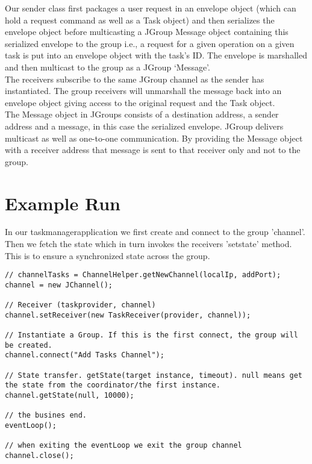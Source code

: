 Our sender class first packages a user request in an envelope object (which can hold a request command as well as a Task object) and then serializes the envelope object before multicasting a JGroup Message object containing this serialized envelope to the group i.e., 
a request for a given operation on a given task is put into an envelope object with the task’s ID. The envelope is marshalled and then multicast to the group as a JGroup ‘Message’.\\

The receivers subscribe to the same JGroup channel as the sender has instantiated. The group receivers will unmarshall the message back into an envelope object giving access to the original request and the Task object. \\

The Message object in JGroups consists of a destination address, a sender address and a message, in this case the serialized envelope. JGroup delivers
multicast as well as one-to-one communication. By providing the Message object with a receiver address that message is sent to that receiver only and not to the group.

\section{Example Run}
\label{jgroup_run}
In our taskmanagerapplication we first create and connect to the group 'channel'. 
Then we fetch the state which in turn invokes the receivers 'setstate' method. 
This is to ensure a synchronized state across the group.   

\begin{lstlisting}[caption=group setup]
// channelTasks = ChannelHelper.getNewChannel(localIp, addPort);
channel = new JChannel();

// Receiver (taskprovider, channel) 
channel.setReceiver(new TaskReceiver(provider, channel));

// Instantiate a Group. If this is the first connect, the group will be created.
channel.connect("Add Tasks Channel");

// State transfer. getState(target instance, timeout). null means get the state from the coordinator/the first instance.        
channel.getState(null, 10000);

// the busines end.
eventLoop();

// when exiting the eventLoop we exit the group channel
channel.close();
\end{lstlisting}

